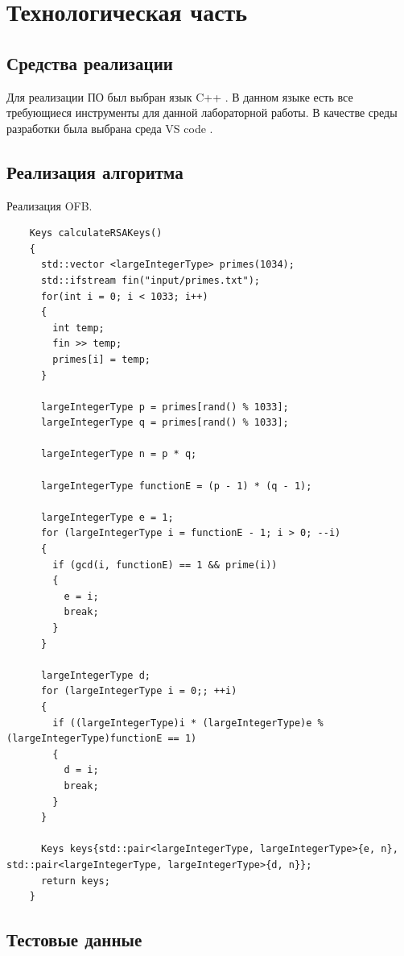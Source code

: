 \section{Технологическая часть}

\subsection{Средства реализации}

Для реализации ПО был выбран язык C++ \cite{c++}.
В данном языке есть все требующиеся инструменты для данной лабораторной работы.
В качестве среды разработки была выбрана среда VS code \cite{vscode}.

\subsection{Реализация алгоритма}

Реализация OFB.

\begin{lstlisting}
    Keys calculateRSAKeys()
    {
      std::vector <largeIntegerType> primes(1034);
      std::ifstream fin("input/primes.txt");
      for(int i = 0; i < 1033; i++)
      {
        int temp;
        fin >> temp;
        primes[i] = temp;
      }
    
      largeIntegerType p = primes[rand() % 1033];
      largeIntegerType q = primes[rand() % 1033];
    
      largeIntegerType n = p * q;
    
      largeIntegerType functionE = (p - 1) * (q - 1);
    
      largeIntegerType e = 1;
      for (largeIntegerType i = functionE - 1; i > 0; --i)
      {
        if (gcd(i, functionE) == 1 && prime(i))
        {
          e = i;
          break;
        }
      }
    
      largeIntegerType d;
      for (largeIntegerType i = 0;; ++i)
      {
        if ((largeIntegerType)i * (largeIntegerType)e % (largeIntegerType)functionE == 1)
        {
          d = i;
          break;
        }
      }
    
      Keys keys{std::pair<largeIntegerType, largeIntegerType>{e, n}, std::pair<largeIntegerType, largeIntegerType>{d, n}};
      return keys;
    }
\end{lstlisting}


\subsection{Тестовые данные}

